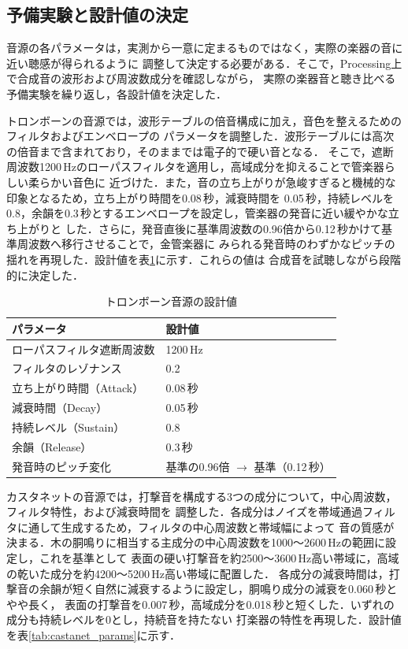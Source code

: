 \subsection{予備実験と設計値の決定}
音源の各パラメータは，実測から一意に定まるものではなく，実際の楽器の音に近い聴感が得られるように
調整して決定する必要がある．そこで，Processing上で合成音の波形および周波数成分を確認しながら，
実際の楽器音と聴き比べる予備実験を繰り返し，各設計値を決定した．

トロンボーンの音源では，波形テーブルの倍音構成に加え，音色を整えるためのフィルタおよびエンベロープの
パラメータを調整した．波形テーブルには高次の倍音まで含まれており，そのままでは電子的で硬い音となる．
そこで，遮断周波数1200\,Hzのローパスフィルタを適用し，高域成分を抑えることで管楽器らしい柔らかい音色に
近づけた．また，音の立ち上がりが急峻すぎると機械的な印象となるため，立ち上がり時間を0.08\,秒，減衰時間を
0.05\,秒，持続レベルを0.8，余韻を0.3\,秒とするエンベロープを設定し，管楽器の発音に近い緩やかな立ち上がりと
した．さらに，発音直後に基準周波数の0.96倍から0.12\,秒かけて基準周波数へ移行させることで，金管楽器に
みられる発音時のわずかなピッチの揺れを再現した．設計値を表\ref{tab:trombone_params}に示す．これらの値は
合成音を試聴しながら段階的に決定した．

\begin{table}[H]
  \centering
  \caption{トロンボーン音源の設計値}
  \label{tab:trombone_params}
  \begin{tabular}{ll}
    \hline
    パラメータ & 設計値 \\
    \hline
    ローパスフィルタ遮断周波数 & 1200\,Hz \\
    フィルタのレゾナンス & 0.2 \\
    立ち上がり時間（Attack） & 0.08\,秒 \\
    減衰時間（Decay） & 0.05\,秒 \\
    持続レベル（Sustain） & 0.8 \\
    余韻（Release） & 0.3\,秒 \\
    発音時のピッチ変化 & 基準の0.96倍 $\rightarrow$ 基準（0.12\,秒） \\
    \hline
  \end{tabular}
\end{table}

カスタネットの音源では，打撃音を構成する3つの成分について，中心周波数，フィルタ特性，および減衰時間を
調整した．各成分はノイズを帯域通過フィルタに通して生成するため，フィルタの中心周波数と帯域幅によって
音の質感が決まる．木の胴鳴りに相当する主成分の中心周波数を1000〜2600\,Hzの範囲に設定し，これを基準として
表面の硬い打撃音を約2500〜3600\,Hz高い帯域に，高域の乾いた成分を約4200〜5200\,Hz高い帯域に配置した．
各成分の減衰時間は，打撃音の余韻が短く自然に減衰するように設定し，胴鳴り成分の減衰を0.060\,秒とやや長く，
表面の打撃音を0.007\,秒，高域成分を0.018\,秒と短くした．いずれの成分も持続レベルを0とし，持続音を持たない
打楽器の特性を再現した．設計値を表\ref{tab:castanet_params}に示す．


